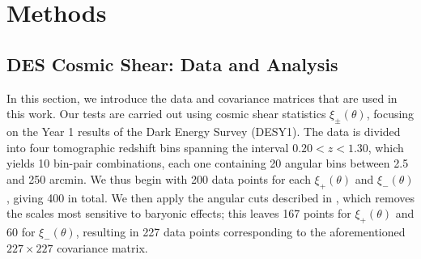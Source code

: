 \documentclass[twocolumn]{\docclass}
\newcommand{\rsec}[1]{\S\ref{sec:#1}}
\begin{document}
	
	
	\section{Methods}
	\label{sec:methods}
	
	\subsection{DES Cosmic Shear: Data and Analysis}
	\label{subsec:data_and_analysis}
	
	In this section, we introduce the data and covariance matrices that are used in this work. Our tests are carried out using cosmic shear statistics $\xi_\pm(\theta)$, focusing on the Year 1 results of the Dark Energy Survey \citep{Troxel:2017xyo,Abbott:2018cms} (DESY1). The data is divided into four tomographic redshift bins spanning the interval $0.20 < z < 1.30$, which yields 10 bin-pair combinations, each one containing 20 angular bins between 2.5 and 250 arcmin. We thus begin with 200 data points for each $\xi_+(\theta)$ and $\xi_-(\theta)$, giving 400 in total. We then apply the angular cuts described in \citep{Abbott:2018cms}, which removes the scales most sensitive to baryonic effects; this leaves 167 points for $\xi_+(\theta)$ and 60 for $\xi_-(\theta)$, resulting in 227 data points corresponding to the aforementioned $227 \times 227$ covariance matrix. 
	
\end{document}
